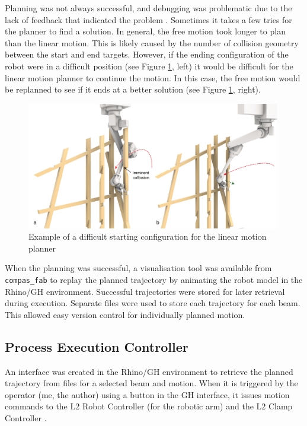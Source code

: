 Planning was not always successful, and debugging was problematic due to the lack of feedback that indicated the problem . Sometimes it takes a few tries for the planner to find a solution. In general, the free motion took longer to plan than the linear motion. This is likely caused by the number of collision geometry between the start and end targets. However, if the ending configuration of the robot were in a difficult position (see Figure \ref{fig:difficult-starting-configuration}, left) it would be difficult for the linear motion planner to continue the motion. In this case, the free motion would be replanned to see if it ends at a better solution (see Figure \ref{fig:difficult-starting-configuration}, right).

\begin{figure}
    \centering
    \includegraphics[width=0.99\textwidth]{images/05/image36.pdf}
    \caption{Example of a difficult starting configuration for the linear motion planner}
    \label{fig:difficult-starting-configuration}
\end{figure}

When the planning was successful, a visualisation tool was available from \verb|compas_fab| to replay the planned trajectory by animating the robot model in the Rhino/GH environment. Successful trajectories were stored for later retrieval during execution. Separate files were used to store each trajectory for each beam. This allowed easy version control for individually planned motion. 

\subsection{Process Execution Controller}
\label{subsection:exploration-2-process-execution-controller}

An interface was created in the Rhino/GH environment to retrieve the planned trajectory from files for a selected beam and motion. When it is triggered by the operator (me, the author) using a button in the GH interface, it issues motion commands to the L2 Robot Controller (for the robotic arm) and the L2 Clamp Controller . 

